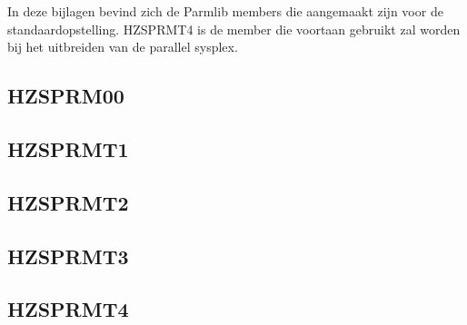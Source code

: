 In deze bijlagen bevind zich de Parmlib members die aangemaakt zijn voor de standaardopstelling. HZSPRMT4 is de member die voortaan gebruikt zal worden bij het uitbreiden van de parallel sysplex.

\subsection{HZSPRM00}
\label{subsec:HZSPRM00}



\subsection{HZSPRMT1}
\label{subsec:HZSPRMT1}



\subsection{HZSPRMT2}
\label{subsec:HZSPRMT2}



\subsection{HZSPRMT3}
\label{subsec:HZSPRMT3}



\subsection{HZSPRMT4}
\label{subsec:HZSPRMT4}

